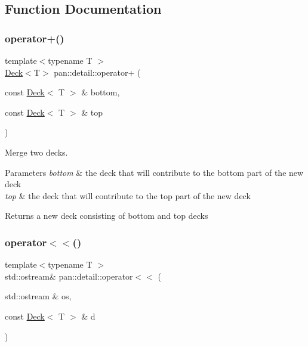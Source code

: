 \subsection{Function Documentation}
\mbox{\label{namespacepan_1_1detail_ac7baf4c74b8184d0b46616e0066b7d14}} 
\subsubsection{\texorpdfstring{operator+()}{operator+()}}
{\footnotesize\ttfamily template$<$typename T $>$ \\
\hyperlink{classpan_1_1detail_1_1_deck}{Deck}$<$T$>$ pan\+::detail\+::operator+ (\begin{DoxyParamCaption}\item[{const \hyperlink{classpan_1_1detail_1_1_deck}{Deck}$<$ T $>$ \&}]{bottom,  }\item[{const \hyperlink{classpan_1_1detail_1_1_deck}{Deck}$<$ T $>$ \&}]{top }\end{DoxyParamCaption})}

Merge two decks. 
\begin{DoxyParams}{Parameters}
{\em bottom} & the deck that will contribute to the bottom part of the new deck \\
\hline
{\em top} & the deck that will contribute to the top part of the new deck \\
\hline
\end{DoxyParams}
\begin{DoxyReturn}{Returns}
a new deck consisting of bottom and top decks 
\end{DoxyReturn}
\mbox{\label{namespacepan_1_1detail_a17e20816d23cefffd0e8212ab9070b69}} 
\subsubsection{\texorpdfstring{operator$<$$<$()}{operator<<()}}
{\footnotesize\ttfamily template$<$typename T $>$ \\
std\+::ostream\& pan\+::detail\+::operator$<$$<$ (\begin{DoxyParamCaption}\item[{std\+::ostream \&}]{os,  }\item[{const \hyperlink{classpan_1_1detail_1_1_deck}{Deck}$<$ T $>$ \&}]{d }\end{DoxyParamCaption})}

